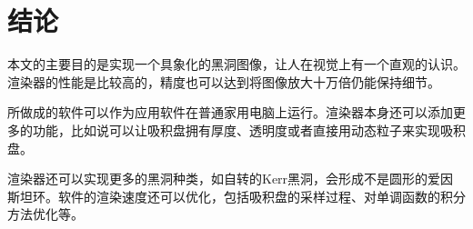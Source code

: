 \chapter{结论}


本文的主要目的是实现一个具象化的黑洞图像，让人在视觉上有一个直观的认识。渲染器的性能是比较高的，精度也可以达到将图像放大十万倍仍能保持细节。

所做成的软件可以作为应用软件在普通家用电脑上运行。渲染器本身还可以添加更多的功能，比如说可以让吸积盘拥有厚度、透明度或者直接用动态粒子来实现吸积盘。

渲染器还可以实现更多的黑洞种类，如自转的Kerr黑洞，会形成不是圆形的爱因斯坦环。软件的渲染速度还可以优化，包括吸积盘的采样过程、对单调函数的积分方法优化等。
